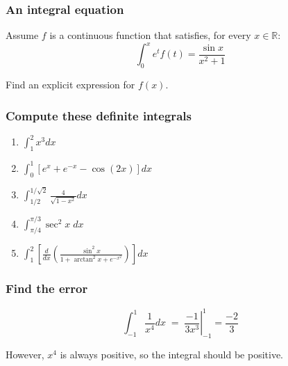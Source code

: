 \documentclass[14pt]{beamer}
\newcommand {\DS} [1] {${\displaystyle #1}$}
\newcommand {\R}{\mathbb{R}}
\begin{document}
\begin{frame}[t]
\frametitle{An integral equation}

Assume $f$ is a continuous function that satisfies, for every $x \in \R$:
	$$
		\int_0^x e^t f(t) = \frac{\sin x}{x^2+1}
	$$

	
Find an explicit expression for $f(x)$.

\end{frame}
\begin{frame}[t]
\frametitle{Compute these definite integrals}

\begin{enumerate}

	\item \DS{\int_1^{2} x^3 dx}
	\vfill
	
	\item \DS{\int_0^{1} \left[ e ^x + e^{-x} - \cos (2x) \right] dx}
	\vfill

	\item \DS{\int_{1/2}^{1/\sqrt{2}} \frac{4}{\sqrt{1-x^2}} dx}
	\vfill

	\item \DS{\int_{\pi/4}^{\pi/3}   \sec^2 x  \; dx}
	\vfill
	
	\item  \DS{\int_1^2 \left[  \frac{d}{dx} \left( \frac{\sin^2 x }{1 + \arctan^2 x + e^{-x^2}}  \right) \right]  dx}
	\vfill
	
\end{enumerate}

\end{frame}
\begin{frame}[t]
\frametitle{Find the error}

	$$
		\int_{-1}^{1} \frac{1}{x^4} dx \; = \; \left. \frac{-1}{3x^3} \right\vert_{-1}^{1} = \frac{-2}{3}
	$$

However, $x^4$ is always positive, so the integral should be positive.


\end{frame}
\end{document}
